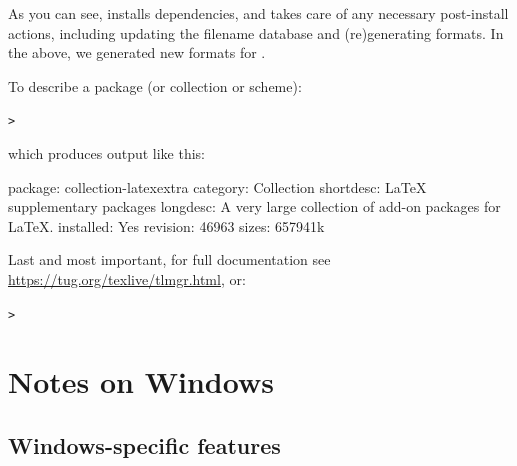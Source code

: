 \documentclass[12pt]{article}
\begin{document}
As you can see,  installs dependencies, and takes care of any
necessary post-install actions, including updating the filename database
and (re)generating formats.  In the above, we generated new formats for
\XeTeX.

To describe a package (or collection or scheme):
\begin{alltt}
> 
\end{alltt}
which produces output like this:
\begin{fverbatim}
package:    collection-latexextra
category:   Collection
shortdesc:  LaTeX supplementary packages
longdesc:   A very large collection of add-on packages for LaTeX.
installed:  Yes
revision:   46963
sizes:      657941k
\end{fverbatim}

Last and most important, for full documentation see
\url{https://tug.org/texlive/tlmgr.html}, or:
\begin{alltt}
> 
\end{alltt}


\section{Notes on Windows}
\label{sec:windows}

\subsection{Windows-specific features}
\label{sec:winfeatures}
\end{document}
